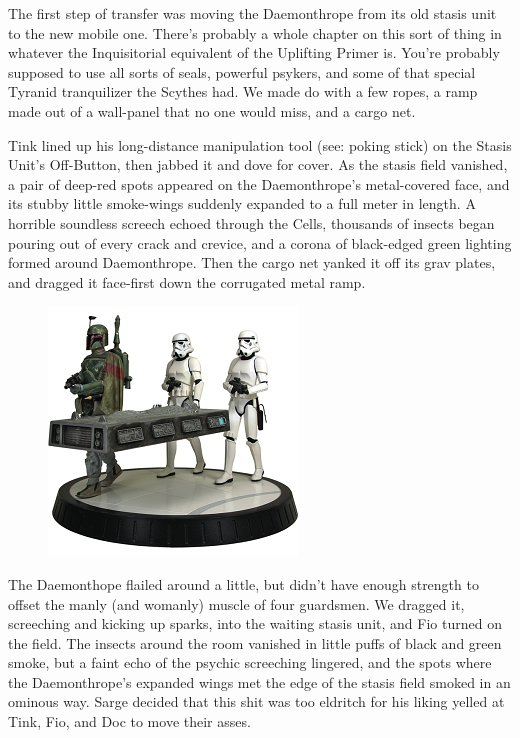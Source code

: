 The first step of transfer was moving the Daemonthrope from its old stasis unit to the new mobile one. 
There's probably a whole chapter on this sort of thing in whatever the Inquisitorial equivalent of the Uplifting Primer is. 
You're probably supposed to use all sorts of seals, powerful psykers, and some of that special Tyranid tranquilizer the Scythes had. 
We made do with a few ropes, a ramp made out of a wall-panel that no one would miss, and a cargo net.

Tink lined up his long-distance manipulation tool (see: 
poking stick) on the Stasis Unit's Off-Button, then jabbed it and dove for cover. 
As the stasis field vanished, a pair of deep-red spots appeared on the Daemonthrope's metal-covered face, and its stubby little smoke-wings suddenly expanded to a full meter in length. 
A horrible soundless screech echoed through the Cells, thousands of insects began pouring out of every crack and crevice, and a corona of black-edged green lighting formed around Daemonthrope. 
Then the cargo net yanked it off its grav plates, and dragged it face-first down the corrugated metal ramp.

\begin{figure}
	\begin{center}
		\includegraphics[width=\figwidth]{pics/15/47.png}
	\end{center}
\end{figure}
The Daemonthope flailed around a little, but didn't have enough strength to offset the manly (and womanly) muscle of four guardsmen. 
We dragged it, screeching and kicking up sparks, into the waiting stasis unit, and Fio turned on the field. 
The insects around the room vanished in little puffs of black and green smoke, but a faint echo of the psychic screeching lingered, and the spots where the Daemonthrope's expanded wings met the edge of the stasis field smoked in an ominous way. 
Sarge decided that this shit was too eldritch for his liking yelled at Tink, Fio, and Doc to move their asses.

